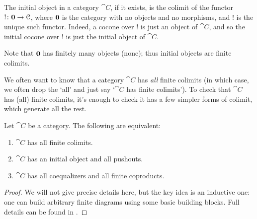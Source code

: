\documentclass[7Sketches]{subfiles}
\begin{document}
\begin{example}%
The initial object in a category $\cat{C}$, if it exists, is the colimit of the
functor $!\colon \mathbf{0} \to \mathcal{C}$, where $\mathbf{0}$ is the category with no
objects and no morphisms, and $!$ is the unique such functor. Indeed, a cocone
over $!$ is just an object of $\cat{C}$, and so the initial cocone over $!$ is
just the initial object of $\cat{C}$.

Note that $\mathbf{0}$ has finitely many objects (none); thus initial objects are finite
colimits.
\end{example}

We often want to know that a category $\cat{C}$ has \emph{all} finite colimits (in which case, we often drop the `all' and just say `$\cat{C}$ has finite colimits'). To check that $\cat{C}$ has (all) finite colimits, it's enough to check it has a few simpler forms of colimit, which generate all the rest. 
\begin{proposition}%
\label{prop.finite_colimits}
Let $\cat{C}$ be a category. The following are equivalent:
\begin{enumerate}
	\item $\cat{C}$ has all finite colimits.
	\item $\cat{C}$ has an initial object and all pushouts.
	\item $\cat{C}$ has all coequalizers and all finite coproducts.
\end{enumerate}
\end{proposition}
\begin{proof}
We will not give precise details here, but the key idea is an inductive one: one can build arbitrary finite diagrams using some basic building blocks. Full details can be found in \cite[Prop 2.8.2]{Borceux:1994a}.
\end{proof}
\end{document}
